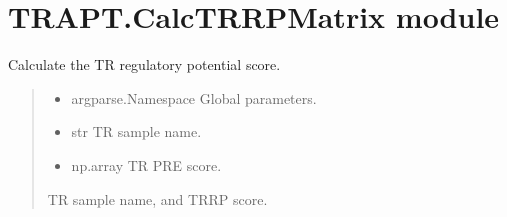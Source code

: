 \documentclass[letterpaper,10pt,english]{sphinxmanual}
\begin{document}
\chapter{TRAPT.CalcTRRPMatrix module}
\label{\detokenize{index:module-TRAPT.CalcTRRPMatrix}}\label{\detokenize{index:trapt-calctrrpmatrix-module}}

\begin{fulllineitems}
\label{\detokenize{index:TRAPT.CalcTRRPMatrix.dhs2gene}}
\pysigstartsignatures
{}
\pysigstopsignatures
\sphinxAtStartPar
Calculate the TR regulatory potential score.
\begin{quote}\begin{description}
\begin{itemize}
\item {} 
\sphinxAtStartPar
{} \textendash{} argparse.Namespace
Global parameters.

\item {} 
\sphinxAtStartPar
{} \textendash{} str
TR sample name.

\item {} 
\sphinxAtStartPar
{} \textendash{} np.array
TR PRE score.

\end{itemize}

\sphinxAtStartPar
TR sample name, and TR\sphinxhyphen{}RP score.

\end{description}\end{quote}

\end{fulllineitems}


\begin{fulllineitems}
\label{\detokenize{index:TRAPT.CalcTRRPMatrix.str2bool}}
\pysigstartsignatures
{}
\pysigstopsignatures
\end{fulllineitems}
\end{document}
